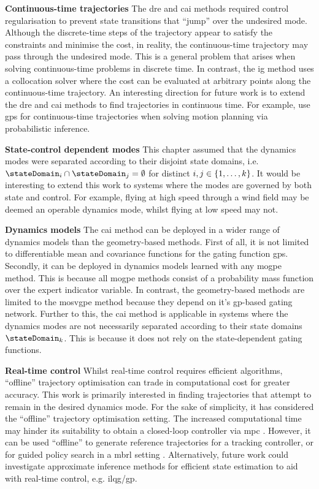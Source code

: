 \documentclass{mimosis-class/mimosis}
\numberwithin{equation}{chapter}
\newcommand{\modeInd}{\ensuremath{k}}
\newcommand{\ModeInd}{\ensuremath{\MakeUppercase{\modeInd}}}
\newcommand{\mode}[1]{\ensuremath{#1_{\modeInd}}}
\begin{document}
{\textbf{Continuous-time trajectories}
The \acrshort{dre} and \acrshort{cai} methods required control regularisation to prevent state transitions that
``jump'' over the undesired mode.
Although the discrete-time steps of the trajectory appear to satisfy the constraints and minimise the cost,
in reality, the continuous-time trajectory may pass through the undesired mode.
This is a general problem that arises when solving continuous-time problems in discrete time.
In contrast, the \acrshort{ig} method uses a collocation solver where the cost can be evaluated at arbitrary
points along the continuous-time trajectory.
An interesting direction for future work is to extend the \acrshort{dre} and \acrshort{cai} methods
to find trajectories in continuous time.
For example, \cite{mukadamContinuoustime2018,dongMotion2016}  use \acrshort{gps} for continuous-time trajectories
when solving motion planning via probabilistic inference.

\textbf{State-control dependent modes}
This chapter assumed that the dynamics modes were separated according to their disjoint
state domains, i.e.
\(\stateDomain_{i} \cap \stateDomain_{j} = \emptyset\) for distinct \(i, j \in \{1, \ldots, \ModeInd\}\).
It would be interesting to extend this work to systems where the modes are governed by both state and control.
For example, flying at high speed through a wind field may be deemed an operable dynamics mode, whilst
flying at low speed may not.

\textbf{Dynamics models}
The \acrshort{cai} method can be deployed in a wider range of dynamics models than the geometry-based
methods.
First of all, it is not limited to differentiable mean and covariance functions for the gating function \acrshort{gps}.
Secondly, it can be deployed in dynamics models learned with any \acrshort{mogpe} method.
This is because all \acrshort{mogpe} methods consist of a probability mass function over the expert indicator
variable.
In contrast, the geometry-based methods are limited to the \acrshort{mosvgpe} method because they depend on
it's \acrshort{gp}-based gating network.
Further to this, the \acrshort{cai} method is applicable in systems where the dynamics modes are not
necessarily separated according to their state domains \(\mode{\stateDomain}\).
This is because it does not rely on the state-dependent gating functions.

\textbf{Real-time control}
Whilst real-time control requires efficient algorithms,
``offline'' trajectory optimisation can trade in computational cost for greater accuracy.
This work is primarily interested in finding trajectories that attempt to remain in the
desired dynamics mode.
For the sake of simplicity, it has considered the ``offline'' trajectory optimisation setting.
The increased computational time may hinder
its suitability to obtain a closed-loop controller via \acrshort{mpc} \citep{eduardof.Model2007}.
However, it can be used ``offline'' to generate reference trajectories for a tracking controller,
or for guided policy search in a \acrshort{mbrl} setting \citep{levineGuided2013}.
Alternatively, future work could investigate approximate inference methods for efficient state estimation
to aid with real-time control, e.g. \acrshort{ilqg}/\acrshort{gp}.

}
\end{document}
